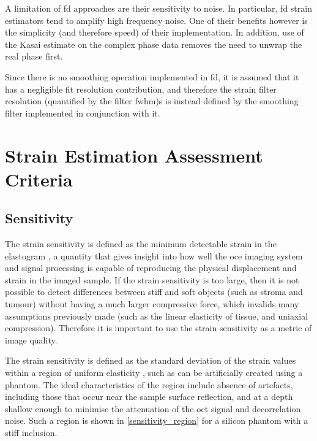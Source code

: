 A limitation of \ac{fd} approaches are their sensitivity to noise. In particular, \ac{fd} strain estimators tend to amplify high frequency noise. One of their benefits however is the simplicity (and therefore speed) of their implementation. In addition, use of the Kasai estimate on the complex phase data removes the need to unwrap the real phase first.

Since there is no smoothing operation implemented in \ac{fd}, it is assumed that it has a negligible fit resolution contribution, and therefore the strain filter resolution (quantified by the filter \ac{fwhm})s is instead defined by the smoothing filter implemented in conjunction with it.

\section{Strain Estimation Assessment Criteria}\label{criteria}

\subsection{Sensitivity}
The strain sensitivity is defined as the minimum detectable strain in the elastogram \cite{kennedy_strain_2012}, a quantity that gives insight into how well the \ac{oce} imaging system and signal processing is capable of reproducing the physical displacement and strain in the imaged sample. If the strain sensitivity is too large, then it is not possible to detect differences between stiff and soft objects (such as stroma and tumour) without having a much larger compressive force, which invalids many assumptions previously made (such as the linear elasticity of tissue, and uniaxial compression). Therefore it is important to use the strain sensitivity as a metric of image quality. 

The strain sensitivity is defined as the standard deviation of the strain values within a region of uniform elasticity \cite{varghese_theoretical_1997}, such as can be artificially created using a phantom. The ideal characteristics of the region include absence of artefacts, including those that occur near the sample surface reflection, and at a depth shallow enough to minimise the attenuation of the \ac{oct} signal and decorrelation noise. Such a region is shown in \autoref{sensitivity_region} for a silicon phantom with a stiff inclusion.


